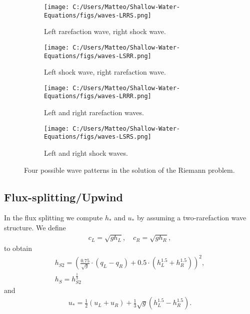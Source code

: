 \begin{figure}[htbp]
    \centering
    \begin{subfigure}[b]{0.4\textwidth}
        \centering
        \texttt{[image: C:/Users/Matteo/Shallow-Water-Equations/figs/waves-LRRS.png]}
        \caption{Left rarefaction wave, right shock wave.}\label{fig:waves-LRRS}
    \end{subfigure}
    \hspace{0.02\textwidth} %
    \begin{subfigure}[b]{0.4\textwidth}
        \centering
        \texttt{[image: C:/Users/Matteo/Shallow-Water-Equations/figs/waves-LSRR.png]}
        \caption{Left shock wave, right rarefaction wave.}\label{fig:waves-LSRR}
    \end{subfigure}
    
    \begin{subfigure}[b]{0.4\textwidth}
        \centering
        \texttt{[image: C:/Users/Matteo/Shallow-Water-Equations/figs/waves-LRRR.png]}
        \caption{Left and right rarefaction waves.}\label{fig:waves-LRRR}
    \end{subfigure}
    \hspace{0.02\textwidth} %
    \begin{subfigure}[b]{0.4\textwidth}
        \centering
        \texttt{[image: C:/Users/Matteo/Shallow-Water-Equations/figs/waves-LSRS.png]}
        \caption{Left and right shock waves.}\label{fig:waves-LSRS}
    \end{subfigure}
    \caption{Four possible wave patterns in the solution of the Riemann problem.}\label{fig:wave-patterns}
\end{figure}


\subsection{Flux-splitting/Upwind}
In the flux splitting we compute $h_*$ and $u_*$ by assuming a two-rarefaction wave structure.
We define 
\begin{align*}
    c_L = \sqrt{g h_L}, \quad c_R = \sqrt{g h_R},
\end{align*}
to obtain
\begin{align*}
    h_{S2} = {\left( \frac{0.75}{\sqrt{g}} \cdot (q_L - q_R) + 0.5 \cdot \left(h_L^{1.5} + h_R^{1.5}\right) \right)}^2, \\
    h_{S} = h_{S2}^{\frac{1}{3}}
\end{align*}
and
\begin{align*}
    u_* = \frac{1}{2} (u_L + u_R) + \frac{1}{3} \sqrt{g} (h_L^{1.5} - h_R^{1.5}).
\end{align*}




